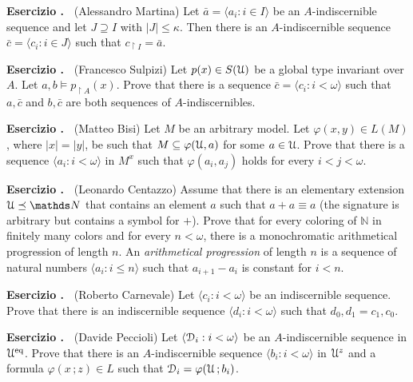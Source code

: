 \documentclass[10pt]{article}
\def\phi{\varphi}
\def\D{\EuScript D}
\def\U{\EuScript U}
\def\NN{\mathds N}
\def\<{\langle}
\def\>{\rangle}
\def\eq{{\rm eq}}
\newcounter{ex}
\newenvironment{exercise}{\bigskip\addtocounter{ex}{1}\textbf{Esercizio \theex.\ }}{}
\begin{document}
\begin{exercise}
  (Alessandro Martina)
  Let $\bar a=\<a_i:i\in I\>$ be an $A$-indiscernible sequence and let $J\supseteq I$ with $|J|\le \kappa$.
  Then there is an $A$-indiscernible sequence $\bar c=\<c_i:i\in J\>$ such that $c_{\restriction I}=\bar a$.
\end{exercise}

\begin{exercise} 
  (Francesco Sulpizi)
  Let  $p(x)\in S(\U)$ be a global type invariant over $A$.
  Let $a,b\models p_{\restriction A}(x)$.
  Prove that there is a sequence $\bar c=\<c_i:i<\omega\>$ such that $a,\bar c$ and $b,\bar c$ are both sequences of $A$-indiscernibles.
\end{exercise}

\begin{exercise}
  (Matteo Bisi)
  Let $M$ be an arbitrary model.
  Let $\phi(x,y)\in L(M)$, where $|x|=|y|$, be such that $M\subseteq\phi(\U,a)$ for some $a\in\U$.
  Prove that there is a sequence $\langle a_i:i<\omega\rangle$ in $M^{x}$ such that $\phi(a_i,a_j)$ holds for every $i<j<\omega$.
\end{exercise}

\begin{exercise}
  (Leonardo Centazzo)
  Assume that there is an elementary extension $\U\preceq\NN$ that contains an element $a$ such that $a+a\equiv a$ (the signature is arbitrary but contains a symbol for $+$).
  Prove that for every coloring of $\NN$ in finitely many colors and for every $n<\omega$, there is a monochromatic arithmetical progression of length $n$.
  An \textit{arithmetical progression\/} of length $n$ is a sequence of natural numbers $\langle a_i : i\le n\rangle$ such that $a_{i+1} - a_i$ is constant for $i<n$.
\end{exercise}

\begin{exercise}
  (Roberto Carnevale)
  Let $\<c_i:i<\omega\>$ be an indiscernible sequence.
  Prove that there is an indiscernible sequence $\<d_i:i<\omega\>$ such that $d_0,d_1 = c_1,c_0$.
\end{exercise}

\begin{exercise}
  (Davide Peccioli)
  Let $\<\D_i:i<\omega\>$ be an $A$-indiscernible sequence in $\U^\eq$.
  Prove that there is an $A$-indiscernible sequence $\<b_i:i<\omega\>$ in $\U^z$ and a formula $\phi(x\,;z)\in L$ such that $\D_i=\phi(\U\,;b_i)$.
\end{exercise}
\end{document}
